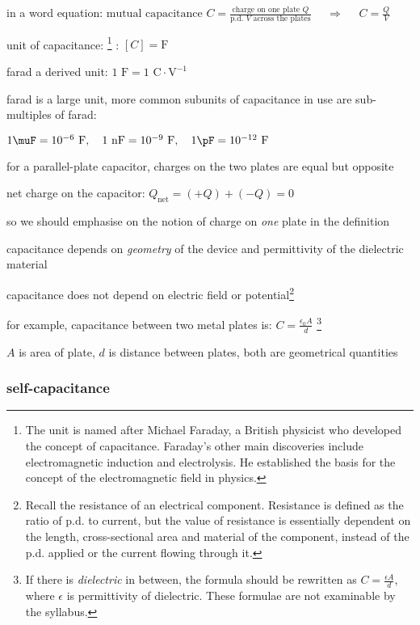 in a word equation: $\text{mutual capacitance } C = \frac{\text{charge on one plate }Q }{\text{p.d. } V \text{ across the plates}}$ $\quad \Rightarrow \quad$ $\boxed{C = \frac{Q}{V}}$


\cmt unit of capacitance: 
\footnote{The unit is named after Michael Faraday, a British physicist who developed the concept of capacitance. Faraday's other main discoveries include electromagnetic induction and electrolysis. He established the basis for the concept of the electromagnetic field in physics.}
: $[C] = \text{F}$

farad a derived unit: $1 \text{ F} = 1 \text{ C}\cdot\text{V}^{-1}$

farad is a large unit, more common subunits of capacitance in use are sub-multiples of farad:

{
	
\centering

$1 \muF = 10^{-6} \text{ F}, \quad 1 \text{ nF} = 10^{-9} \text{ F}, \quad 1 \pF = 10^{-12} \text{ F}$

}

\cmt for a parallel-plate capacitor, charges on the two plates are equal but opposite

net charge on the capacitor: $Q_\text{net} = (+Q)+(-Q)=0$

so we should emphasise on the notion of charge on \emph{one} plate in the definition



\cmt capacitance depends on \emph{geometry} of the device and permittivity of the dielectric material

capacitance does not depend on electric field or potential\footnote{Recall the resistance of an electrical component. Resistance is defined as the ratio of p.d. to current, but the value of resistance is essentially dependent on the length, cross-sectional area and material of the component, instead of the p.d. applied or the current flowing through it.}

for example, capacitance between two metal plates is: $C=\frac{\epsilon_0 A}{d}$
\footnote{If there is \emph{dielectric} in between, the formula should be rewritten as $C = \frac{\epsilon A}{d}$, where $\epsilon$ is permittivity of dielectric. These formulae are not examinable by the syllabus.}

$A$ is area of plate, $d$ is distance between plates, both are geometrical quantities



\subsubsection{self-capacitance}

